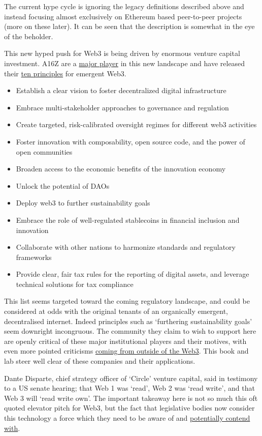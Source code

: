 The current hype cycle is ignoring the legacy definitions described above and instead focusing almost exclusively on Ethereum based peer-to-peer projects (more on these later). It can be seen that the description is somewhat in the eye of the beholder.\par
This new hyped push for Web3 is being driven by enormous venture capital investment. A16Z are a \href{https://a16z.com/2022/01/07/9b-to-build-the-future/}{major player} in this new landscape and have released their \href{https://a16z.com/2022/01/07/how-to-build-a-better-internet-10-principles-for-world-leaders-shaping-the-future-of-web3/}{ten principles} for emergent Web3. 
\begin{itemize}
\item Establish a clear vision to foster decentralized digital infrastructure
\item Embrace multi-stakeholder approaches to governance and regulation
\item Create targeted, risk-calibrated oversight regimes for different web3 activities
\item Foster innovation with composability, open source code, and the power of open communities
\item Broaden access to the economic benefits of the innovation economy
\item Unlock the potential of DAOs
\item Deploy web3 to further sustainability goals
\item Embrace the role of well-regulated stablecoins in financial inclusion and innovation
\item Collaborate with other nations to harmonize standards and regulatory frameworks
\item Provide clear, fair tax rules for the reporting of digital assets, and leverage technical solutions for tax compliance
\end{itemize}
This list seems targeted toward the coming regulatory landscape, and could be considered at odds with the original tenants of an organically emergent, decentralised internet. Indeed principles such as `furthering sustainability goals' seem downright incongruous. The community they claim to wish to support here are openly critical of these major institutional players and their motives, with even more pointed criticisms \href{https://www.profgalloway.com/web3/}{coming from outside of the Web3}. This book and lab steer well clear of these companies and their applications.\par
Dante Disparte, chief strategy officer of `Circle' venture capital, said in testimony to a US senate hearing; that Web 1 was `read', Web 2 was `read write', and that Web 3 will `read write own'. The important takeaway here is not so much this oft quoted elevator pitch for Web3, but the fact that legislative bodies now consider this technology a force which they need to be aware of and \href{https://a16z.com/2021/12/17/prediction-for-the-new-year-a-web3-midterm/}{potentially contend with}.\par
